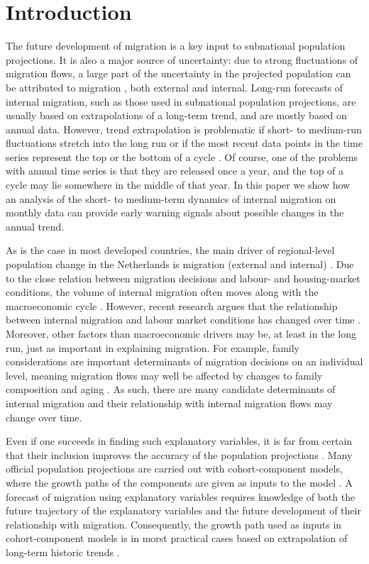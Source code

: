 \documentclass[12pt, a4paper]{article}
\begin{document}
\section{Introduction}\label{introduction}

The future development of migration is a key input to subnational population projections. It is also a major source of uncertainty: due to strong fluctuations of migration flows, a large part of the uncertainty in the projected population can be attributed to migration \citep{beer1993forecast}, both external and internal. Long-run forecasts of internal migration, such as those used in subnational population projections, are usually based on extrapolations of a long-term trend, and are mostly based on annual data. However, trend extrapolation is problematic if short- to medium-run fluctuations stretch into the long run or if the most recent data points in the time series represent the top or the bottom of a cycle \citep{canova1998detrending, hamilton2018}. Of course, one of the problems with annual time series is that they are released once a year, and the top of a cycle may lie somewhere in the middle of that year. In this paper we show how an analysis of the short- to medium-term dynamics of internal migration on monthly data can provide early warning signals about possible changes in the annual trend.

As is the case in most developed countries, the main driver of
regional-level population change in the Netherlands is migration
(external and internal) \citep{teriele2019}. Due to the close relation between migration
decisions and labour- and housing-market conditions, the volume of
internal migration often moves along with the macroeconomic cycle \citep{husby2019trek}. However,
recent research argues that the relationship between internal migration and labour market conditions has changed over time \citep{kaplan2017understanding}. Moreover, other
factors than macroeconomic drivers may be, at least in the long run, just as important in explaining migration. For example, family considerations are important
determinants of migration decisions on an individual level, meaning
migration flows may well be affected by changes to family composition
and aging \citep{mulder2018putting}. As such, there are many candidate determinants of internal migration and their relationship with internal migration flows may change over time.

Even if one succeeds in finding such explanatory variables, it is far from certain that their inclusion improves the accuracy of the population projections \citep{smith1997further, makridakis2019forecasting}. Many official population projections are carried out with cohort-component
models, where the growth paths of the components are given as inputs to
the model \citep[e.g., ][]{de2005achtergronden}. A forecast of migration using explanatory variables requires knowledge of both the future trajectory of the explanatory variables and the future development of their relationship with migration. Consequently, the growth path used as inputs in
cohort-component models is in morst practical cases based on extrapolation of
long-term historic trends \citep{smith2013practitioner}.
\end{document}
